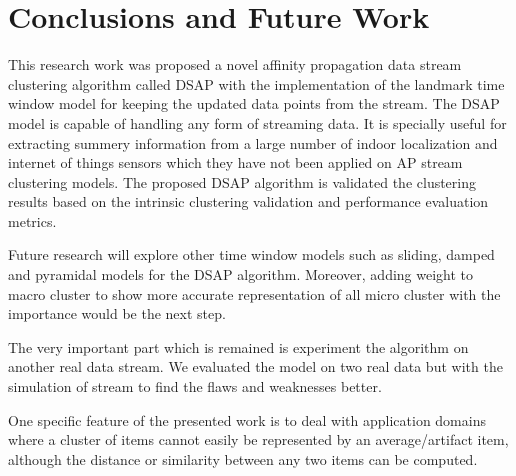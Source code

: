 \setlength{\parindent}{2em}

% 
\chapter{Conclusions and Future Work}

This research work was proposed a novel affinity propagation data stream clustering algorithm called DSAP with the implementation of the landmark time window model for keeping the updated data points from the stream. The DSAP model is capable of handling any form of streaming data. It is specially useful for extracting summery information from a large number of indoor localization and internet of things sensors which they have not been applied on AP stream clustering models.
The proposed DSAP algorithm is validated the clustering results based on the intrinsic clustering validation and performance evaluation metrics.  

Future research will explore other time window models such as sliding, damped and pyramidal models for the DSAP algorithm. Moreover, adding weight to macro cluster to show more accurate representation of all micro cluster with the importance would be the next step.  

The very important part which is remained is experiment the algorithm on another real data stream. We evaluated the model on two real data but with the simulation of stream to find the flaws and weaknesses better.

One specific feature of the presented work is to deal with application domains where a cluster of items cannot easily be represented by an average/artifact item, although the distance or similarity between any two items can be computed. 



